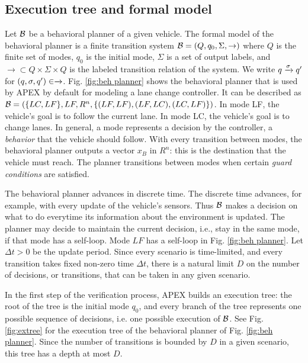 \subsection{Execution tree and formal model}
\label{sec:execution tree}
Let $\mathcal{B}$ be a behavioral planner of a given vehicle.
The formal model of the behavioral planner is a finite transition system $\mathcal{B} = (Q,q_0, \Sigma, \rightarrow)$ where $Q$ is the finite set of modes, $q_0$ is the initial mode, $\Sigma$ is a set of output labels, and $\rightarrow \subset Q\times \Sigma \times Q$ is the labeled transition relation of the system.
We write $q \xrightarrow{\sigma}q'$ for $(q,\sigma,q') \in \xrightarrow{}$.
Fig. \ref{fig:beh planner} shows the behavioral planner that is used by APEX by default for modeling a lane change controller.
It can be described as $\mathcal{B} = (\{LC, LF\}, LF, R^n, \{(LF,LF), (LF,LC), (LC,LF)\})$.
In mode LF, the vehicle's goal is to follow the current lane.
In mode LC, the vehicle's goal is to change lanes.
In general, a mode represents a decision by the controller, a \emph{behavior} that the vehicle should follow.
With every transition between modes, the behavioral planner outputs a vector $x_B$ in $R^n$: this is the destination that the vehicle must reach.
The planner transitions between modes when certain \emph{guard conditions} are satisfied.

The behavioral planner advances in discrete time.
The discrete time advances, for example, with every update of the vehicle's sensors.
Thus $\mathcal{B}$ makes a decision on what to do everytime its information about the environment is updated.
The planner may decide to maintain the current decision, i.e., stay in the same mode, if that mode has a self-loop.
Mode $LF$ has a self-loop in Fig. \ref{fig:beh planner}.
Let $\Delta t >0$ be the update period.
Since every scenario is time-limited, and every transition takes fixed non-zero time $\Delta t$, there is a natural limit $D$ on the number of decisions, or transitions, that can be taken in any given scenario.

In the first step of the verification process, APEX builds an execution tree: the root of the tree is the initial mode $q_0$, and every branch of the tree represents one possible sequence of decisions, i.e. one possible execution of $\mathcal{B}$.
See Fig. \ref{fig:extree} for the execution tree of the behavioral planner of Fig. \ref{fig:beh planner}.
Since the number of transitions is bounded by $D$ in a given scenario, this tree has a depth at most $D$.


